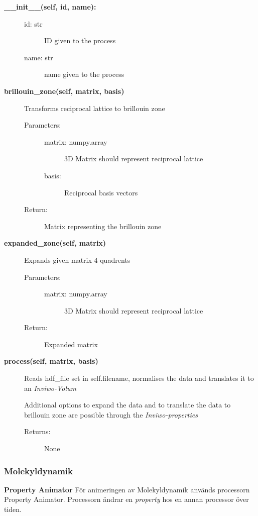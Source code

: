 \documentclass[10pt,oneside,swedish]{article}
\begin{document}
\begin{description}
\item[\textbf{\_\_init\_\_(self, id, name):}]
\begin{description}
\item[id: str]
ID given to the process
\item[name: str]
name given to the process
\end{description}
\item[\textbf{brillouin\_zone(self, matrix, basis)}]
Transforms reciprocal lattice to brillouin zone

\begin{description}
\item[Parameters:]
\begin{description}
\item[matrix: numpy.array]
3D Matrix should represent reciprocal lattice
\item[basis:]
Reciprocal basis vectors
\end{description}
\item[Return:]
Matrix representing the brillouin zone
\end{description}
\item[\textbf{expanded\_zone(self, matrix)}]
Expands given matrix 4 quadrents

\begin{description}
\item[Parameters:]
\begin{description}
\item[matrix: numpy.array]
3D Matrix should represent reciprocal lattice
\end{description}
\item[Return:]
Expanded matrix
\end{description}
\item[\textbf{process(self, matrix, basis)}]
Reads hdf\_file set in self.filename, normalises the data and translates
it to an \emph{Inviwo-Volum}

Additional options to expand the data and to translate the data to
brillouin zone are possible through the \emph{Inviwo-properties}

\begin{description}
\item[Returns:]
None
\end{description}
\end{description}

\subsubsection{Molekyldynamik}\label{Molekyldynamik}
\textbf{Property Animator}
För animeringen av Molekyldynamik används processorn Property Animator. Processorn ändrar en \emph{property} hos en annan processor över tiden.
\end{document}

